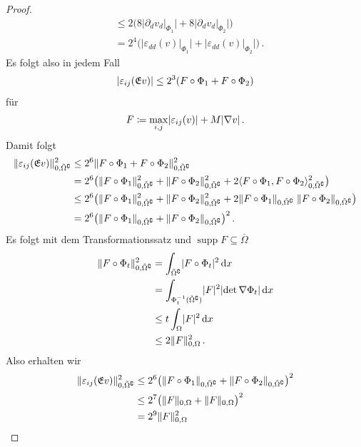 \documentclass{scrartcl}
\def\e{\varepsilon}
\newcommand{\tiOmega}{\tilde{\Omega}}
\newcommand{\erw}{\mathfrak{E}}			%
\newcommand{\dif}[1]{\,\mathrm{d} #1}
\DeclareMathOperator{\supp}{supp}			%
\DeclarePairedDelimiter{\abs}{\lvert}{\rvert}
\DeclarePairedDelimiter{\inner}{\langle}{\rangle}
\DeclarePairedDelimiter{\norm}{\lVert}{\rVert}
\begin{document}
\begin{proof}
\begin{align*}
		&\leq 2\Big(8\big\lvert\partial_dv_d\vert_{\Phi_1}\big\rvert+8\big\lvert\partial_dv_d\vert_{\Phi_2}\big\rvert\Big) \\
		&= 2^4\Big(\big\lvert\e_{dd}(v)\vert_{\Phi_1}\big\rvert+\big\lvert\e_{dd}(v)\vert_{\Phi_2}\big\rvert\Big)\,.
	\end{align*}
	Es folgt also in jedem Fall
	\begin{align*}
		\abs{\e_{ij}(\erw v)}
		\leq 2^3(F\circ \Phi_1+F\circ\Phi_2)
	\end{align*}
	für
	\begin{align*}
		F\coloneqq \max_{i,j}\abs{\e_{ij}(v)}+M\abs{\nabla v}\,.
	\end{align*}
	Damit folgt
	\begin{align*}
		\norm{\e_{ij}(\erw v)}_{0,\tiOmega^\complement}^2
		&\leq 2^6\norm{F\circ \Phi_1+F\circ\Phi_2}_{0,\tiOmega^\complement}^2 \\
		&= 2^6\big(\norm{F\circ \Phi_1}_{0,\tiOmega^\complement}^2+\norm{F\circ\Phi_2}_{0,\tiOmega^\complement}^2+2\inner{F\circ \Phi_1,F\circ\Phi_2}_{0,\tiOmega^\complement}^2\big) \\
		&\leq 2^6\big(\norm{F\circ \Phi_1}_{0,\tiOmega^\complement}^2+\norm{F\circ \Phi_2}_{0,\tiOmega^\complement}^2+2\norm{F\circ \Phi_1}_{0,\tiOmega^\complement}\;\norm{F\circ \Phi_2}_{0,\tiOmega^\complement}\big) \\
		&= 2^6\big(\norm{F\circ \Phi_1}_{0,\tiOmega^\complement}+\norm{F\circ \Phi_2}_{0,\tiOmega^\complement}\big)^2\,.
	\end{align*}
	Es folgt mit dem Transformationssatz und $\supp F\subseteq\overline{\Omega}$
	\begin{align*}
		\norm{F\circ\Phi_t}_{0,\tiOmega^\complement}^2
		&=\int_{\tiOmega^\complement}\abs{F\circ\Phi_t}^2\dif x \\
		&= \int_{\Phi_t^{-1}(\tiOmega^\complement)}\abs{F}^2\abs{\det\nabla\Phi_t}\dif x \\
		&\leq t\int_{\Omega}\abs{F}^2\dif x \\
		&\leq 2\norm{F}_{0,\Omega}^2\,.
	\end{align*}
	Also erhalten wir
	\begin{align*}
		\norm{\e_{ij}(\erw v)}_{0,\tiOmega^\complement}^2
		&\leq  2^6\big(\norm{F\circ \Phi_1}_{0,\tiOmega^\complement}+\norm{F\circ \Phi_2}_{0,\tiOmega^\complement}\big)^2 \\
		&\leq  2^7\big(\norm{F}_{0,\Omega}+\norm{F}_{0,\Omega}\big)^2 \\
		&=  2^{9}\norm{F}_{0,\Omega}^2 \\

\end{align*}
\end{proof}
\end{document}
